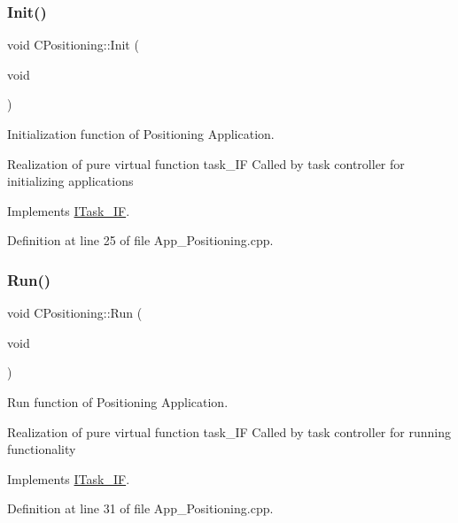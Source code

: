 \subsubsection{\texorpdfstring{Init()}{Init()}}
{\footnotesize\ttfamily void C\+Positioning\+::\+Init (\begin{DoxyParamCaption}\item[{void}]{ }\end{DoxyParamCaption})\hspace{0.3cm}{\ttfamily [virtual]}}



Initialization function of Positioning Application. 

Realization of pure virtual function task\+\_\+\+IF Called by task controller for initializing applications 

Implements \mbox{\hyperlink{class_i_task___i_f_a28f608bdb9b19658403f7b9b7421968d}{I\+Task\+\_\+\+IF}}.



Definition at line 25 of file App\+\_\+\+Positioning.\+cpp.

\mbox{\label{class_c_positioning_ad0e439dcc95c450548c2806077aeff57}} 
\subsubsection{\texorpdfstring{Run()}{Run()}}
{\footnotesize\ttfamily void C\+Positioning\+::\+Run (\begin{DoxyParamCaption}\item[{void}]{ }\end{DoxyParamCaption})\hspace{0.3cm}{\ttfamily [virtual]}}



Run function of Positioning Application. 

Realization of pure virtual function task\+\_\+\+IF Called by task controller for running functionality 

Implements \mbox{\hyperlink{class_i_task___i_f_ab73cc5879a61d00fc59b72cce32cc6f7}{I\+Task\+\_\+\+IF}}.



Definition at line 31 of file App\+\_\+\+Positioning.\+cpp.

\mbox{\label{class_c_positioning_a2706c9bb6bb52201c279386fd2c9dd89}} 
